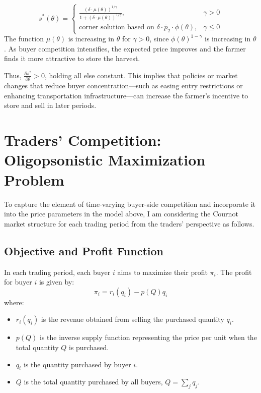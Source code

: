 \documentclass[12pt]{article}
\begin{document}
\[
s^*(\theta) = 
\begin{cases}
\displaystyle \frac{\left( \delta \cdot \mu(\theta) \right)^{1/\gamma}}{1 + \left( \delta \cdot \mu(\theta) \right)^{1/\gamma}}, & \gamma > 0 \\
\text{corner solution based on } \delta \cdot \bar{p}_2 \cdot \phi(\theta), & \gamma \leq 0
\end{cases}
\]
The function \( \mu(\theta) \) is increasing in \( \theta \) for \( \gamma > 0 \), since \( \phi(\theta)^{1 - \gamma} \) is increasing in \( \theta \). As buyer competition intensifies, the expected price improves and the farmer finds it more attractive to store the harvest. 

Thus, \( \frac{\partial s^*}{\partial \theta} > 0 \), holding all else constant. This implies that policies or market changes that reduce buyer concentration—such as easing entry restrictions or enhancing transportation infrastructure—can increase the farmer’s incentive to store and sell in later periods.












\newpage
\section{Traders' Competition: Oligopsonistic Maximization Problem}

To capture the element of time-varying buyer-side competition and incorporate it into the price parameters in the model above, I am considering the Cournot market structure for each trading period from the traders' perspective as follows. 

\subsection{Objective and Profit Function}
In each trading period, each buyer \( i \) aims to maximize their profit \( \pi_i \). The profit for buyer \( i \) is given by:
\begin{equation}
\pi_i = r_i(q_i) - p(Q) q_i
\end{equation}
where:
\begin{itemize}
  \item \( r_i(q_i) \) is the revenue obtained from selling the purchased quantity \( q_i \).
  \item \( p(Q) \) is the inverse supply function representing the price per unit when the total quantity \( Q \) is purchased.
  \item \( q_i \) is the quantity purchased by buyer \( i \).
  \item \( Q \) is the total quantity purchased by all buyers, \( Q = \sum_{j} q_j \).
\end{itemize}
\end{document}
